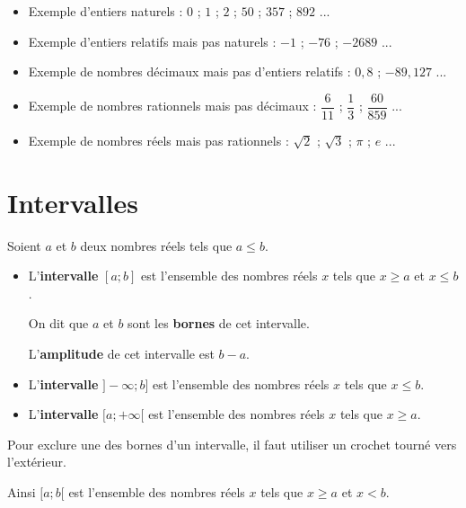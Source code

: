 \documentclass[classe=$2^{de}$]{coursclass}
\begin{document}
\begin{exemple}
	\begin{itemize}
		\item Exemple d'entiers naturels : $0$ ; $1$ ; $2$ ; $50$ ; $357$ ; $892$ ...
		\item Exemple d'entiers relatifs mais pas naturels : $-1$ ; $-76$ ; $-2689$ ...
		\item Exemple de nombres décimaux mais pas d'entiers relatifs : $0,8$ ; $-89,127$ ...
		\item Exemple de nombres rationnels mais pas décimaux : $\dfrac{6}{11}$ ; $\dfrac{1}{3}$ ; $\dfrac{60}{859}$ ...
		\item Exemple de nombres réels mais pas rationnels : $\sqrt{2}$ ; $\sqrt{3}$ ; $π$ ; $e$ ...
	\end{itemize}
\end{exemple}

\section{Intervalles}

\begin{definition}[Intervalle de $ℝ$]
	Soient $a$ et $b$ deux nombres réels tels que $a ≤ b$.
	\begin{itemize}
		\item L'\textbf{intervalle} $[a ; b]$ est l'ensemble des nombres réels $x$ tels que $x ≥ a$ et $x ≤ b$.

		      On dit que $a$ et $b$ sont les \textbf{bornes} de cet intervalle.

		      L'\textbf{amplitude} de cet intervalle est $b - a$.
		\item L'\textbf{intervalle} $]-∞ ; b]$ est l'ensemble des nombres réels $x$ tels que $x ≤ b$.
		\item L'\textbf{intervalle} $[a ; +∞[$ est l'ensemble des nombres réels $x$ tels que $x ≥ a$.
	\end{itemize}

	Pour exclure une des bornes d'un intervalle, il faut utiliser un crochet tourné vers l'extérieur.

	Ainsi $[a ; b[$ est l'ensemble des nombres réels $x$ tels que $x ≥ a$ et $x < b$.
\end{definition}
\end{document}
